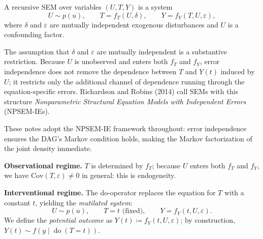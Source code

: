 \documentclass[
  a4paper,
]{book}
\newcommand{\doop}{\operatorname{do}}
\begin{document}
\begin{tcolorbox}[enhanced jigsaw, arc=.35mm, bottomrule=.15mm, bottomtitle=1mm, breakable, colback=white, colbacktitle=quarto-callout-note-color!10!white, colframe=quarto-callout-note-color-frame, coltitle=black, left=2mm, leftrule=.75mm, opacityback=0, opacitybacktitle=0.6, rightrule=.15mm, title={Definition: Structural Equation Model (SEM)}, titlerule=0mm, toprule=.15mm, toptitle=1mm]

A recursive SEM over variables \((U, T, Y)\) is a system
\[U \sim p(u), \qquad T = f_T(U, \delta), \qquad Y = f_Y(T, U, \varepsilon),\]
where \(\delta\) and \(\varepsilon\) are mutually independent exogenous
disturbances and \(U\) is a confounding factor.

\end{tcolorbox}

\begin{tcolorbox}[enhanced jigsaw, arc=.35mm, bottomrule=.15mm, bottomtitle=1mm, breakable, colback=white, colbacktitle=quarto-callout-note-color!10!white, colframe=quarto-callout-note-color-frame, coltitle=black, left=2mm, leftrule=.75mm, opacityback=0, opacitybacktitle=0.6, rightrule=.15mm, title={Remark: Error Independence in the NPSEM-IE}, titlerule=0mm, toprule=.15mm, toptitle=1mm]

The assumption that \(\delta\) and \(\varepsilon\) are mutually
independent is a substantive restriction. Because \(U\) is unobserved
and enters both \(f_T\) and \(f_Y\), error independence does not remove
the dependence between \(T\) and \(Y(t)\) induced by \(U\); it restricts
only the additional channel of dependence running through the
equation-specific errors. Richardson and Robins (2014) call SEMs with
this structure \emph{Nonparametric Structural Equation Models with
Independent Errors} (NPSEM-IEs).

These notes adopt the NPSEM-IE framework throughout: error independence
ensures the DAG's Markov condition holds, making the Markov
factorization of the joint density immediate.

\end{tcolorbox}

\textbf{Observational regime.} \(T\) is determined by \(f_T\); because
\(U\) enters both \(f_T\) and \(f_Y\), we have
\(\mathrm{Cov}(T,\varepsilon) \neq 0\) in general: this is endogeneity.

\textbf{Interventional regime.} The do-operator replaces the equation
for \(T\) with a constant \(t\), yielding the \emph{mutilated system}:
\[U \sim p(u), \qquad T = t \text{ (fixed)}, \qquad Y = f_Y(t, U, \varepsilon).\]
We define the \emph{potential outcome} as
\(Y(t) \coloneqq f_Y(t, U, \varepsilon)\); by construction,
\(Y(t) \sim f(y \mid \doop(T{=}t))\).
\end{document}
